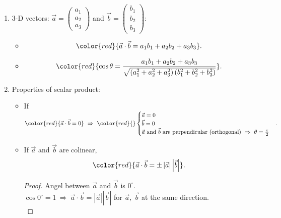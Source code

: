 \documentclass[12pt, a4paper]{article}
\newtheorem{proof}{Proof}[subsection]
\begin{document}
\begin{enumerate}
\begin{itemize}
\begin{proof}
$$\begin{aligned}
        \left|\vec{b}\right|^2-2\vec{a}\vec{b}+\left|\vec{a}\right|^2&=\left|\vec{a}\right|^2+\left|\vec{b}\right|^2-2\left|\vec{a}\right|\left|\vec{b}\right|\cos\theta\\
        \therefore \vec{a}\cdot\vec{b}&=\left|\vec{a}\right|\left|\vec{b}\right|\cos\theta.
      \end{aligned}$$
    \end{proof}
    \item Combining the two definitions: 
    $${\color{red}{\cos\theta=\frac{a_1b_1+a_2b_2}{\sqrt{\left(a_1^2+a_2^2\right)\left(b_1^2+b_2^2\right)}}}}.$$
  \end{itemize}
  \item 3-D vectors: $\vec{a}=\begin{pmatrix}a_1\\a_2\\a_3\end{pmatrix}$ and $\vec{b}=\begin{pmatrix}b_1\\b_2\\b_3\end{pmatrix}$: 
  \begin{itemize}
    \item $${\color{red}{\vec{a}\cdot\vec{b}=a_1b_1+a_2b_2+a_3b_3}}.$$
    \item $${\color{red}{\cos\theta=\frac{a_1b_1+a_2b_2+a_3b_3}{\sqrt{\left(a_1^2+a_2^2+a_3^2\right)\left(b_1^2+b_2^2+b_3^2\right)}}}}.$$
  \end{itemize}
  \item Properties of scalar product: 
  \begin{itemize}
    \item If ${\color{red}{\vec{a}\cdot\vec{b}=0}}\ \Rightarrow\ {\color{red}{}\begin{cases}\vec{a}=0\\\vec{b}=0\\\vec{a}\text{ and }\vec{b}\text{ are perpendicular (orthogonal)}\ \Rightarrow\ \theta=\frac{\pi}{2}\end{cases}}.$
    \item If $\vec{a}$ and $\vec{b}$ are colinear, $${\color{red}{\vec{a}\cdot\vec{b}=\pm\left|\vec{a}\right|\left|\vec{b}\right|}}.$$
    \begin{proof}
      Angel between $\vec{a}$ and $\vec{b}$ is $0^\circ$.\\
      $\cos0^\circ=1\ \Rightarrow\ \vec{a}\cdot\vec{b}=\left|\vec{a}\right|\left|\vec{b}\right|$ for $\vec{a},\ \vec{b}$ at the same direction.\\

\end{proof}
\end{itemize}
\end{enumerate}
\end{document}
